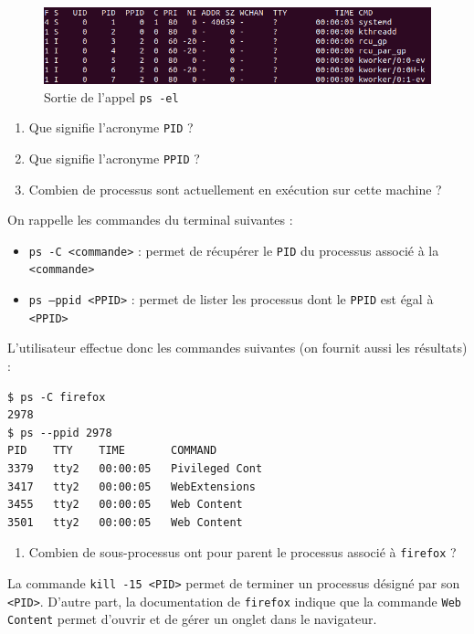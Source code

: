 \documentclass[a4paper, 11pt]{article}
\begin{document}
\begin{figure}[!ht]
	\centering
	\includegraphics[width=0.9\columnwidth]{ps}
	\centering
	\caption{Sortie de l'appel \texttt{ps -el}}
\end{figure}

\begin{enumerate}
	\item Que signifie l'acronyme \texttt{PID} ?
	
	\item Que signifie l'acronyme \texttt{PPID} ?
	
	\item Combien de processus sont actuellement en exécution sur cette machine ?
	
\end{enumerate}

\pagebreak
On rappelle les commandes du terminal suivantes :
\begin{itemize}
	\item \texttt{ps -C <commande>} : permet de récupérer le \texttt{PID} du processus associé à la \texttt{<commande>}
	\item \texttt{ps --ppid <PPID>} : permet de lister les processus dont le \texttt{PPID} est égal à \texttt{<PPID>}
\end{itemize}

L'utilisateur effectue donc les commandes suivantes (on fournit aussi les résultats) :

\begin{lstlisting}[style=stylebash]
$ ps -C firefox
2978
$ ps --ppid 2978
PID    TTY    TIME       COMMAND
3379   tty2   00:00:05   Pivileged Cont
3417   tty2   00:00:05   WebExtensions
3455   tty2   00:00:05   Web Content
3501   tty2   00:00:05   Web Content
\end{lstlisting}

\begin{enumerate}[resume*]
	\item Combien de sous-processus ont pour parent le processus associé à \texttt{firefox} ?
\end{enumerate}

La commande \texttt{kill -15 <PID>} permet de terminer un processus désigné par son \texttt{<PID>}.
D'autre part, la documentation de \texttt{firefox} indique que la commande \texttt{Web Content} permet d'ouvrir et de gérer un onglet dans le navigateur.
\end{document}
